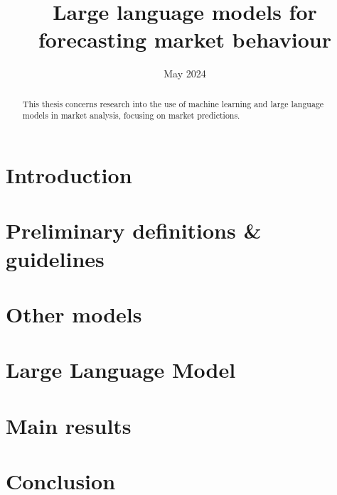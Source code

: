 \documentclass[licencjacka, en]{pracamgr}
\title{Large language models for forecasting market behaviour}
\date{May 2024}
\begin{document}
\newcommand{\rozdzial}[2]{
	\chapter{#1}
	\label{chap:#2}
	
}

\maketitle

\begin{abstract}
	This thesis concerns research into the use of machine learning
	and large language models in market analysis, focusing on market
	predictions.

\end{abstract}

\tableofcontents

\rozdzial{Introduction}{introduction}
\rozdzial{Preliminary definitions \& guidelines}{preliminary-definitions}
\rozdzial{Other models}{other-models}
\rozdzial{Large Language Model}{large-language-model}
\rozdzial{Main results}{results}
\rozdzial{Conclusion}{conclusion}
\appendix

\end{document}
